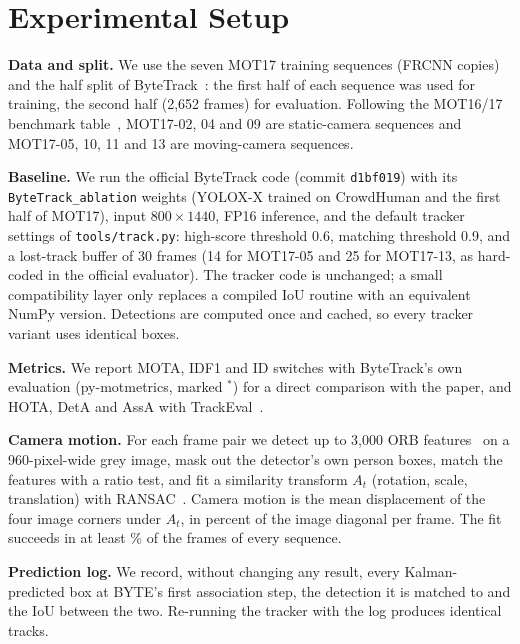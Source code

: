 \documentclass[conference]{IEEEtran}
\begin{document}
\section{Experimental Setup}
\textbf{Data and split.} We use the seven MOT17 training sequences (FRCNN copies) and the half split of
ByteTrack~\cite{zhang2022bytetrack}: the first half of each sequence was used for training, the second half
(2{,}652 frames) for evaluation. Following the MOT16/17 benchmark table~\cite{milan2016mot16}, MOT17-02, 04 and 09 are
static-camera sequences and MOT17-05, 10, 11 and 13 are moving-camera sequences.

\textbf{Baseline.} We run the official ByteTrack code (commit \texttt{d1bf019}) with its \texttt{ByteTrack\_ablation}
weights (YOLOX-X trained on CrowdHuman and the first half of MOT17), input $800\times1440$, FP16 inference, and the
default tracker settings of \texttt{tools/track.py}: high-score threshold 0.6, matching threshold 0.9, and a lost-track
buffer of 30 frames (14 for MOT17-05 and 25 for MOT17-13, as hard-coded in the official evaluator). The tracker code is
unchanged; a small compatibility layer only replaces a compiled IoU routine with an equivalent NumPy version. Detections
are computed once and cached, so every tracker variant uses identical boxes.

\textbf{Metrics.} We report MOTA, IDF1 and ID switches with ByteTrack's own evaluation (py-motmetrics, marked $^*$) for a
direct comparison with the paper, and HOTA, DetA and AssA with TrackEval~\cite{luiten2021hota}.

\textbf{Camera motion.} For each frame pair we detect up to 3{,}000 ORB features~\cite{rublee2011orb} on a 960-pixel-wide
grey image, mask out the detector's own person boxes, match the features with a ratio test, and fit a similarity
transform $A_t$ (rotation, scale, translation) with RANSAC~\cite{fischler1981ransac}. Camera motion is the mean
displacement of the four image corners under $A_t$, in percent of the image diagonal per frame. The fit succeeds in at
least \vFitOkMin\% of the frames of every sequence.

\textbf{Prediction log.} We record, without changing any result, every Kalman-predicted box at BYTE's first association
step, the detection it is matched to and the IoU between the two. Re-running the tracker with the log produces identical
tracks.

\end{document}
